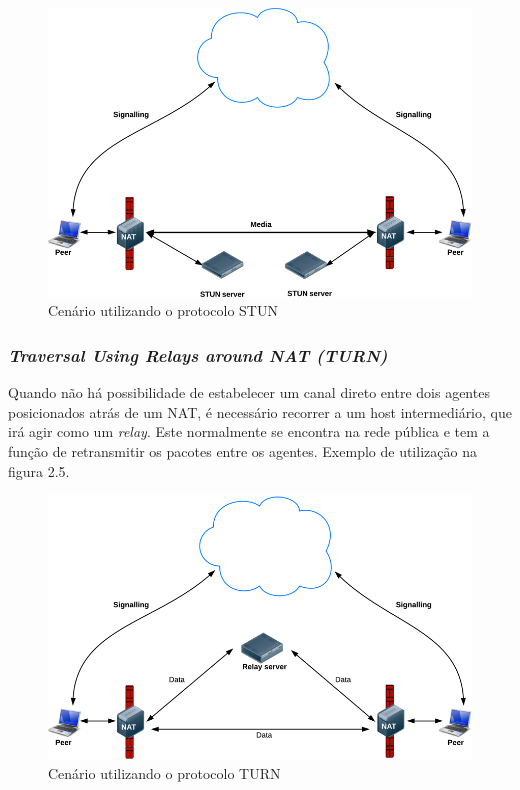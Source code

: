 \documentclass[ruledheader]{abnt} %
\begin{document}
\begin{figure}[!htdb]
 \centering
  \includegraphics[width = 1\linewidth]{images/stun}
  \caption{Cenário utilizando o protocolo STUN} %
  \label{f_mediaStream}
\end{figure}

\subsubsection{\textit{Traversal Using Relays around NAT (TURN)}}

Quando não há possibilidade de estabelecer um canal direto entre dois agentes posicionados atrás de um NAT, é necessário recorrer a um host intermediário, que irá agir como um \textit{relay}. Este normalmente se encontra na rede pública e tem a função de retransmitir os pacotes entre os agentes\cite{Varanda:2008}. Exemplo de utilização na figura 2.5.


\begin{figure}[!htdb]
 \centering
  \includegraphics[width = 1\linewidth]{images/turn}
  \caption{Cenário utilizando o protocolo TURN} %
  \label{f_mediaStream}
\end{figure}
\end{document}
